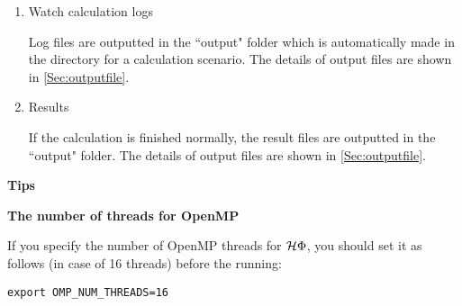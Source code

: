 \begin{enumerate}
\begin{itemize}
\end{itemize}

\item Watch calculation logs

Log files are outputted in the ``output" folder which is automatically made in the directory for a calculation scenario.
The details of output files are shown in \ref{Sec:outputfile}.

\item Results

If the calculation is finished normally, the result files are outputted in  the ``output" folder. The details of output files are shown in \ref{Sec:outputfile}.

\end{enumerate}

\begin{screen}
\Large 
{\bf Tips}
\normalsize

{\bf The number of threads for OpenMP}

If you specify the number of OpenMP threads for $\mathcal{H} \Phi$,
you should set it as follows (in case of 16 threads) before the running:
\begin{verbatim}
export OMP_NUM_THREADS=16
\end{verbatim}

\end{screen}

